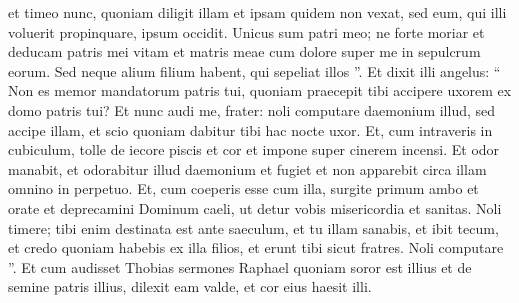 \begin{biblechapter}
\begin{biblechapter}
\begin{biblechapter}
\begin{biblechapter}
\begin{biblechapter}
\begin{biblechapter}
\verse et timeo nunc, quoniam diligit illam et ipsam quidem non vexat, sed eum, qui illi voluerit propinquare, ipsum occidit. Unicus sum patri meo; ne forte moriar et deducam patris mei vitam et matris meae cum dolore super me in sepulcrum eorum. Sed neque alium filium habent, qui sepeliat illos ”. 
\verse Et dixit illi angelus: “ Non es memor mandatorum patris tui, quoniam praecepit tibi accipere uxorem ex domo patris tui? Et nunc audi me, frater: noli computare daemonium illud, sed accipe illam, et scio quoniam dabitur tibi hac nocte uxor. 
\verse Et, cum intraveris in cubiculum, tolle de iecore piscis et cor et impone super cinerem incensi. Et odor manabit, et odorabitur illud daemonium et fugiet et non apparebit circa illam omnino in perpetuo. 
\verse Et, cum coeperis esse cum illa, surgite primum ambo et orate et deprecamini Dominum caeli, ut detur vobis misericordia et sanitas. Noli timere; tibi enim destinata est ante saeculum, et tu illam sanabis, et ibit tecum, et credo quoniam habebis ex illa filios, et erunt tibi sicut fratres. Noli computare ”. Et cum audisset Thobias sermones Raphael quoniam soror est illius et de semine patris illius, dilexit eam valde, et cor eius haesit illi.
 

\end{biblechapter}
\end{biblechapter}
\end{biblechapter}
\end{biblechapter}
\end{biblechapter}
\end{biblechapter}
